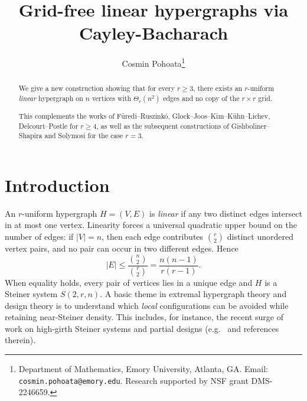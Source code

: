 \documentclass[11pt]{article}
\title{Grid-free linear hypergraphs via Cayley-Bacharach}
\author{%
Cosmin Pohoata\thanks{Department of Mathematics, Emory University, Atlanta, GA. Email: {\tt cosmin.pohoata@emory.edu}. Research supported by NSF grant DMS-2246659. }%
}
\date{}
\theoremstyle{definition}
\theoremstyle{remark}
\begin{document}
\maketitle

\begin{abstract}
We give a new construction showing that for every $r\ge 3$, there exists an $r$-uniform \emph{linear} hypergraph on $n$ vertices with $\Theta_r(n^2)$ edges and no copy of the $r\times r$ grid.

This complements the works of F\"uredi--Ruszink\'o, Glock--Joos--Kim--K\"uhn--Lichev, Delcourt--Postle for $r \geq 4$, as well as the subsequent constructions of Gishboliner--Shapira and Solymosi for the case $r=3$.
\end{abstract}

\section{Introduction} \label{sec:intro}

An $r$-uniform hypergraph $H=(V,E)$ is \emph{linear} if any two distinct edges intersect in at most one vertex.
Linearity forces a universal quadratic upper bound on the number of edges: if $|V|=n$, then each edge contributes
$\binom{r}{2}$ distinct unordered vertex pairs, and no pair can occur in two different edges. Hence
\begin{equation}\label{eq:paircount}
|E|
\le \frac{\binom{n}{2}}{\binom{r}{2}}
= \frac{n(n-1)}{r(r-1)}.
\end{equation}
When equality holds, every pair of vertices lies in a unique edge and $H$ is a Steiner system $S(2,r,n)$.
A basic theme in extremal hypergraph theory and design theory is to understand which \emph{local} configurations can be
avoided while retaining near-Steiner density. This includes, for instance, the recent surge of work on high-girth
Steiner systems and partial designs
(e.g.\ \cite{HighGirth,conflictfree} and references therein).
\end{document}

